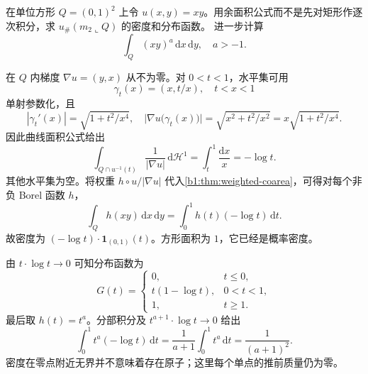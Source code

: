 \begin{exercise}\label{b1:ex:18-product-logarithmic-density}
在单位方形 \(Q=(0,1)^2\) 上令 \(u(x,y)=xy\)。用余面积公式而不是先对矩形作逐次积分，求 \(u_\#(m_2\llcorner Q)\) 的密度和分布函数。
进一步计算
\[
 \int_Q(xy)^a\,\mathrm dx\,\mathrm dy,
 \quad a>-1.
\]
\end{exercise}
\begin{solution}
在 \(Q\) 内梯度 \(\nabla u=(y,x)\) 从不为零。对 \(0<t<1\)，水平集可用
\[
 \gamma_t(x)=(x,t/x),
 \quad t<x<1
\]
单射参数化，且
\[
 |\gamma_t'(x)|=\sqrt{1+t^2/x^4},
 \quad \bigl|\nabla u\bigl(\gamma_t(x)\bigr)\bigr|
 =\sqrt{x^2+t^2/x^2}
 =x\sqrt{1+t^2/x^4}.
\]
因此曲线面积公式给出
\[
 \int_{Q\cap u^{-1}(t)}\frac1{|\nabla u|}\,\mathrm d\mathcal H^1
 =\int_t^1\frac{\mathrm dx}{x}=-\log t.
\]
其他水平集为空。将权重 \(h\circ u/|\nabla u|\) 代入\cref{b1:thm:weighted-coarea}，可得对每个非负 Borel 函数 \(h\)，
\[
 \int_Qh(xy)\,\mathrm dx\,\mathrm dy
 =\int_0^1h(t)(-\log t)\,\mathrm dt.
\]
故密度为 \((-\log t)\cdot\mathbf1_{(0,1)}(t)\)。方形面积为 \(1\)，它已经是概率密度。

由 \(t\cdot \log t\to0\) 可知分布函数为
\[
 G(t)=
 \begin{cases}
 0,&t\le0,\\
 t(1-\log t),&0<t<1,\\
 1,&t\ge1.
 \end{cases}
\]
最后取 \(h(t)=t^a\)。分部积分及 \(t^{a+1}\cdot \log t\to0\) 给出
\[
 \int_0^1t^a(-\log t)\,\mathrm dt
 =\frac1{a+1}\int_0^1t^a\,\mathrm dt
 =\frac1{(a+1)^2}.
\]
密度在零点附近无界并不意味着存在原子；这里每个单点的推前质量仍为零。
\end{solution}

